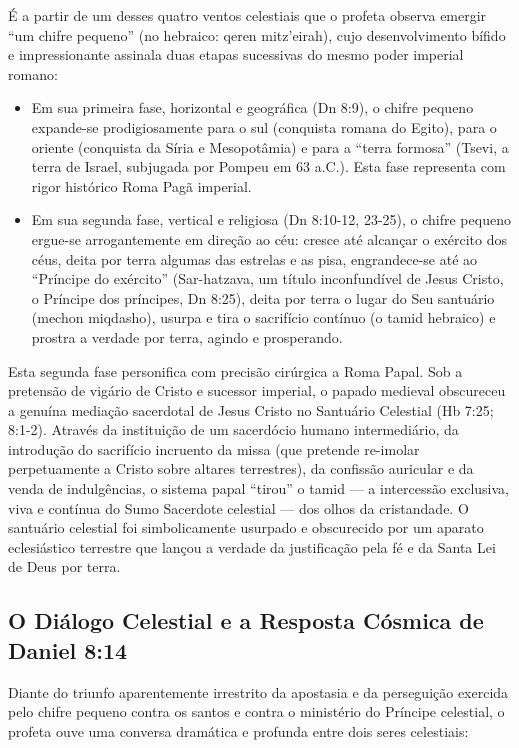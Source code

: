 \documentclass[11pt,a4paper,openany]{book}
\begin{document}
É a partir de um desses quatro ventos celestiais que o profeta observa emergir ``um chifre pequeno'' (no hebraico: qeren mitz'eirah), cujo desenvolvimento bífido e impressionante assinala duas etapas sucessivas do mesmo poder imperial romano:
\begin{itemize}
  \item Em sua primeira fase, horizontal e geográfica (Dn 8:9), o chifre pequeno expande-se prodigiosamente para o sul (conquista romana do Egito), para o oriente (conquista da Síria e Mesopotâmia) e para a ``terra formosa'' (Tsevi, a terra de Israel, subjugada por Pompeu em 63 a.C.). Esta fase representa com rigor histórico Roma Pagã imperial.
  \item Em sua segunda fase, vertical e religiosa (Dn 8:10-12, 23-25), o chifre pequeno ergue-se arrogantemente em direção ao céu: cresce até alcançar o exército dos céus, deita por terra algumas das estrelas e as pisa, engrandece-se até ao ``Príncipe do exército'' (Sar-hatzava, um título inconfundível de Jesus Cristo, o Príncipe dos príncipes, Dn 8:25), deita por terra o lugar do Seu santuário (mechon miqdasho), usurpa e tira o sacrifício contínuo (o tamid hebraico) e prostra a verdade por terra, agindo e prosperando.
\end{itemize}


Esta segunda fase personifica com precisão cirúrgica a Roma Papal. Sob a pretensão de vigário de Cristo e sucessor imperial, o papado medieval obscureceu a genuína mediação sacerdotal de Jesus Cristo no Santuário Celestial (Hb 7:25; 8:1-2). Através da instituição de um sacerdócio humano intermediário, da introdução do sacrifício incruento da missa (que pretende re-imolar perpetuamente a Cristo sobre altares terrestres), da confissão auricular e da venda de indulgências, o sistema papal ``tirou'' o tamid — a intercessão exclusiva, viva e contínua do Sumo Sacerdote celestial — dos olhos da cristandade. O santuário celestial foi simbolicamente usurpado e obscurecido por um aparato eclesiástico terrestre que lançou a verdade da justificação pela fé e da Santa Lei de Deus por terra.



\subsection{O Diálogo Celestial e a Resposta Cósmica de Daniel 8:14}


Diante do triunfo aparentemente irrestrito da apostasia e da perseguição exercida pelo chifre pequeno contra os santos e contra o ministério do Príncipe celestial, o profeta ouve uma conversa dramática e profunda entre dois seres celestiais:
\end{document}
